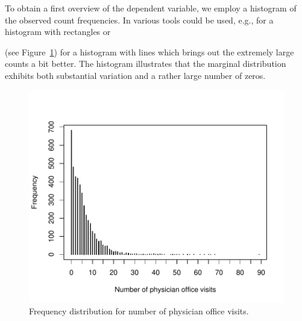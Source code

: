 \documentclass{Z}
\begin{document}
To obtain a first overview of the dependent variable, we employ a histogram of the
observed count frequencies. In  various tools could be used, e.g.,
 for a histogram with rectangles or
\begin{Schunk}
\end{Schunk}
(see Figure~\ref{fig:ofp}) for a histogram with lines which brings out the extremely
large counts a bit better. The histogram illustrates that the marginal distribution
exhibits both substantial variation and a rather large number of zeros.

\begin{figure}[p]
\begin{center}
\includegraphics{countreg-ofp-plot2}
\caption{\label{fig:ofp} Frequency distribution for number of physician office visits.}
\end{center}
\end{figure}
\end{document}
